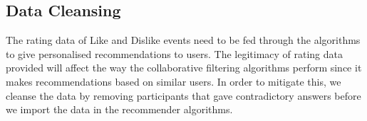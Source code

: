 % 


\subsection{Data Cleansing}

The rating data of Like and Dislike events need to be fed through the algorithms to give personalised recommendations to users. The legitimacy of rating data provided will affect the way the collaborative filtering algorithms perform since it makes recommendations based on similar users. In order to mitigate this, we cleanse the data by removing participants that gave contradictory answers before we import the data in the recommender algorithms.


